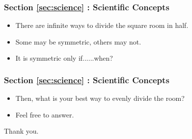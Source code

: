 \documentclass{beamer}
\begin{document}
	\begin{frame}
		\frametitle{Section \ref{sec:science} : Scientific Concepts}
		\begin{itemize}
			\item There are infinite ways to divide the square room in half.
			\item Some may be symmetric, others may not.
			\item It is symmetric only if......when?
		\end{itemize}
	\end{frame}
	
	\begin{frame}
		\frametitle{Section \ref{sec:science} : Scientific Concepts}
		\begin{itemize}
			\item Then, what is your best way to evenly divide the room? 
			\item Feel free to answer.
		\end{itemize}
	\end{frame}
	
	\begin{frame}
		\centering
		Thank you.
	\end{frame}
	
\end{document}

